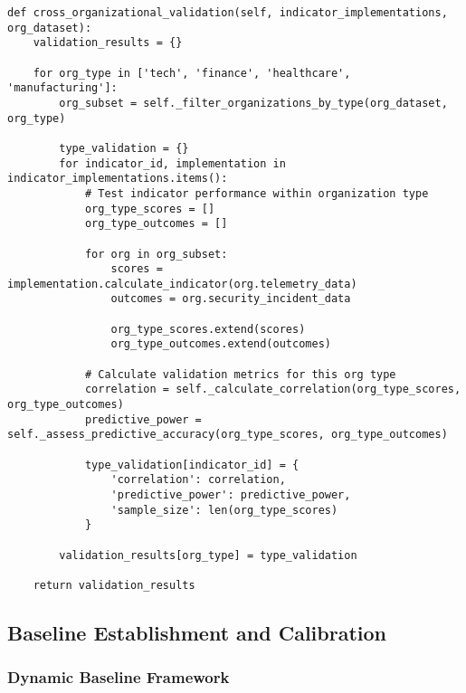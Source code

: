 \documentclass[11pt, onecolumn]{article}
\begin{document}
\begin{lstlisting}
def cross_organizational_validation(self, indicator_implementations, org_dataset):
    validation_results = {}
    
    for org_type in ['tech', 'finance', 'healthcare', 'manufacturing']:
        org_subset = self._filter_organizations_by_type(org_dataset, org_type)
        
        type_validation = {}
        for indicator_id, implementation in indicator_implementations.items():
            # Test indicator performance within organization type
            org_type_scores = []
            org_type_outcomes = []
            
            for org in org_subset:
                scores = implementation.calculate_indicator(org.telemetry_data)
                outcomes = org.security_incident_data
                
                org_type_scores.extend(scores)
                org_type_outcomes.extend(outcomes)
            
            # Calculate validation metrics for this org type
            correlation = self._calculate_correlation(org_type_scores, org_type_outcomes)
            predictive_power = self._assess_predictive_accuracy(org_type_scores, org_type_outcomes)
            
            type_validation[indicator_id] = {
                'correlation': correlation,
                'predictive_power': predictive_power,
                'sample_size': len(org_type_scores)
            }
        
        validation_results[org_type] = type_validation
    
    return validation_results
\end{lstlisting}

\subsection{Baseline Establishment and Calibration}

\subsubsection{Dynamic Baseline Framework}
\end{document}
